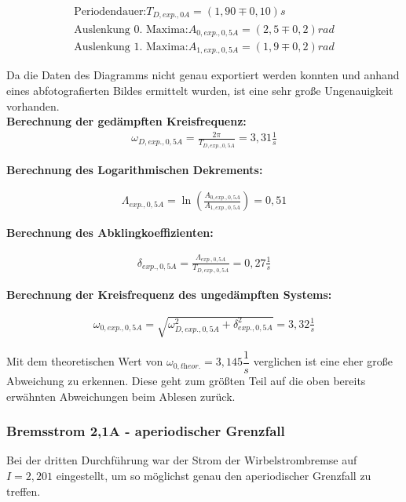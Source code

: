 \documentclass[a4paper]{scrartcl}
\numberwithin{equation}{subsection}
\begin{document}
\begin{align*}
\text{Periodendauer:} T_{D,\textit{exp.},0A} = (1,90\mp0,10)s \\
\text{Auslenkung 0. Maxima:} A_{0,\textit{exp.},0,5A} = (2,5\mp0,2)rad \\
\text{Auslenkung 1. Maxima:} A_{1,\textit{exp.},0,5A} = (1,9\mp0,2)rad
\end{align*}

Da die Daten des Diagramms nicht genau exportiert werden konnten und anhand eines abfotografierten Bildes ermittelt wurden, ist eine sehr große Ungenauigkeit vorhanden. \\

\textbf{Berechnung der gedämpften Kreisfrequenz:}
\begin{align}
\omega_{D,\textit{exp.},0,5A} = \frac{2\pi}{T_{D,\textit{exp.},0,5A}} = 3,31 \frac{1}{s}
\end{align}

\textbf{Berechnung des Logarithmischen Dekrements:}

\begin{align}
\Lambda_{\textit{exp.},0,5A} = \ln(\frac{A_{0,\textit{exp.},0,5A}}{A_{1,\textit{exp.},0,5A}}) = 0,51
\end{align}

\textbf{Berechnung des Abklingkoeffizienten:}

\begin{align}
\delta_{\textit{exp.},0,5A} = \frac{\Lambda_{\textit{exp.},0,5A}}{T_{D,\textit{exp.},0,5A}} = 0,27 \frac{1}{s}
\end{align}

\textbf{Berechnung der Kreisfrequenz des ungedämpften Systems:}

\begin{align}
\omega_{0,\textit{exp.},0,5A} = \sqrt{\omega_{D,\textit{exp.},0,5A}^2 + \delta_{\textit{exp.},0,5A}^2} = 3,32 \frac{1}{s}
\end{align}

Mit dem theoretischen Wert von $\omega_{0,\textit{theor.}} = 3,145 \dfrac{1}{s}$ verglichen ist eine eher große Abweichung zu erkennen. Diese geht zum größten Teil auf die oben bereits erwähnten Abweichungen beim Ablesen zurück.

\subsubsection{Bremsstrom 2,1A - aperiodischer Grenzfall}
Bei der dritten Durchführung war der Strom der Wirbelstrombremse auf $I = 2,201$ eingestellt, um so möglichst genau den aperiodischer Grenzfall zu treffen.
\end{document}
